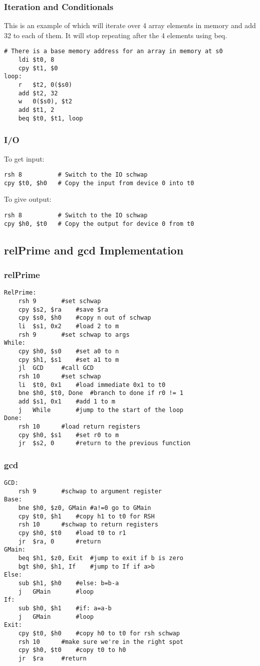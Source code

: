 \documentclass{article}
\begin{document}
		\subsubsection{Iteration and Conditionals}
			This is an example of which will iterate over 4 array elements in memory and add 32 to each of them.  It will stop repeating after the 4 elements using beq.
			\begin{lstlisting}[frame=single]
	# There is a base memory address for an array in memory at s0
	ldi $t0, 8
	cpy $t1, $0
loop:
	r   $t2, 0($s0)
	add $t2, 32
	w   0($s0), $t2
	add $t1, 2
	beq $t0, $t1, loop
			\end{lstlisting}
		\subsubsection{I/O}
			To get input:
			\begin{lstlisting}[frame=single]
rsh 8          # Switch to the IO schwap
cpy $t0, $h0   # Copy the input from device 0 into t0
			\end{lstlisting}
			To give output:
			\begin{lstlisting}[frame=single]
rsh 8          # Switch to the IO schwap
cpy $h0, $t0   # Copy the output for device 0 from t0
			\end{lstlisting}
	\subsection{relPrime and gcd Implementation}
		\subsubsection{relPrime}
			\begin{lstlisting}[frame=single]
RelPrime:	
	rsh	9		#set schwap
	cpy	$s2, $ra	#save $ra
	cpy	$s0, $h0	#copy n out of schwap
	li	$s1, 0x2	#load 2 to m
	rsh	9		#set schwap to args
While:
	cpy	$h0, $s0	#set a0 to n
	cpy	$h1, $s1	#set a1 to m
	jl	GCD		#call GCD
	rsh	10		#set schwap
	li	$t0, 0x1	#load immediate 0x1 to t0
	bne	$h0, $t0, Done	#branch to done if r0 != 1
	add	$s1, 0x1	#add 1 to m
	j	While		#jump to the start of the loop
Done:
	rsh	10		#load return registers
	cpy	$h0, $s1	#set r0 to m
	jr	$s2, 0		#return to the previous function
			\end{lstlisting}
		\subsubsection{gcd}
			\begin{lstlisting}[frame=single]
GCD:
	rsh	9		#schwap to argument register
Base:
	bne	$h0, $z0, GMain	#a!=0 go to GMain
	cpy	$t0, $h1	#copy h1 to t0 for RSH
	rsh	10		#schwap to return registers
	cpy	$h0, $t0	#load t0 to r1
	jr	$ra, 0		#return
GMain:	
	beq	$h1, $z0, Exit	#jump to exit if b is zero
	bgt	$h0, $h1, If	#jump to If if a>b
Else:	
	sub	$h1, $h0	#else: b=b-a
	j	GMain		#loop
If:	
	sub	$h0, $h1	#if: a=a-b
	j	GMain		#loop
Exit:
	cpy	$t0, $h0	#copy h0 to t0 for rsh schwap
	rsh	10		#make sure we're in the right spot
	cpy	$h0, $t0	#copy t0 to h0
	jr	$ra		#return
			\end{lstlisting}
\end{document}
